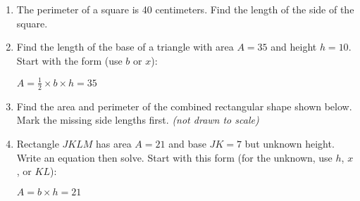 \begin{enumerate}
\newpage
\item The perimeter of a square is 40 centimeters. Find the length of the side of the square. \vspace{2cm}

\item Find the length of the base of a triangle with area $A=35$ and height $h=10$. Start with the form (use $b$ or $x$): \par \medskip
  $A = \frac{1}{2} \times b \times h = 35$
  \begin{flushright}
  \end{flushright}


\item Find the area and perimeter of the combined rectangular shape shown below. Mark the missing side lengths first. \hfill \emph{(not drawn to scale)}
  \begin{flushleft}
  \end{flushleft} 

\item Rectangle $JKLM$ has area $A=21$ and base $JK=7$ but unknown height. Write an equation then solve. Start with this form (for the unknown, use $h$, $x$, or $KL$): \par \medskip
  $A = b \times h = 21$


\end{enumerate}
